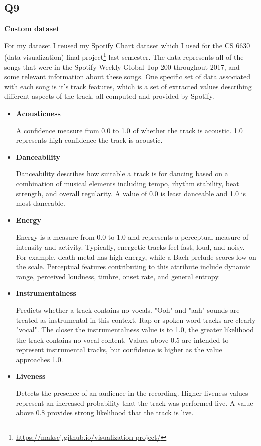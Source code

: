 \documentclass[12pt]{article}
\newcommand{\problem}[2]{
	\subsection*{#1}
	\textbf{#2}
}
\begin{document}
\problem{Q9}{Custom dataset}

For my dataset I reused my Spotify Chart dataset which I used for the CS 6630 (data visualization) final project\footnote{\url{https://makscj.github.io/visualization-project/}} last semester. The data represents all of the songs that were in the Spotify Weekly Global Top 200 throughout 2017, and some relevant information about these songs. One specific set of data associated with each song is it's track features, which is a set of extracted values describing different aspects of the track, all computed and provided by Spotify. 

\begin{itemize}

\item \textbf{Acousticness}

A confidence measure from 0.0 to 1.0 of whether the track is acoustic. 1.0 represents high confidence the track is acoustic.

\item \textbf{Danceability}

Danceability describes how suitable a track is for dancing based on a combination of musical elements including tempo, rhythm stability, beat strength, and overall regularity. A value of 0.0 is least danceable and 1.0 is most danceable.

\item \textbf{Energy}

Energy is a measure from 0.0 to 1.0 and represents a perceptual measure of intensity and activity. Typically, energetic tracks feel fast, loud, and noisy. For example, death metal has high energy, while a Bach prelude scores low on the scale. Perceptual features contributing to this attribute include dynamic range, perceived loudness, timbre, onset rate, and general entropy.

\item \textbf{Instrumentalness}

Predicts whether a track contains no vocals. "Ooh" and "aah" sounds are treated as instrumental in this context. Rap or spoken word tracks are clearly "vocal". The closer the instrumentalness value is to 1.0, the greater likelihood the track contains no vocal content. Values above 0.5 are intended to represent instrumental tracks, but confidence is higher as the value approaches 1.0.

\item \textbf{Liveness}

Detects the presence of an audience in the recording. Higher liveness values represent an increased probability that the track was performed live. A value above 0.8 provides strong likelihood that the track is live.


\end{itemize}
\end{document}
